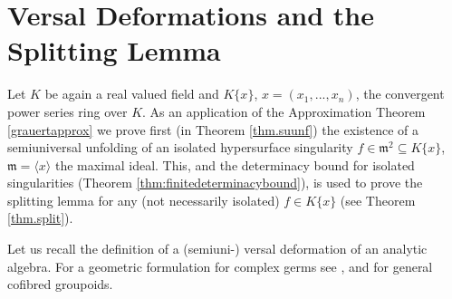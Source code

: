 \documentclass[11pt]{article}
\newcommand{\fm}{\mathfrak{m}}
\begin{document}

\section{Versal Deformations and the Splitting Lemma}\label{sec.split}

Let $K$ be again a real valued field and $K\{x\}$, $x= (x_1,...,x_n)$, the convergent power series ring over $K$. As an application of the Approximation Theorem \ref{grauertapprox} we prove first (in Theorem \ref{thm.suunf}) the existence of a semiuniversal unfolding of an isolated hypersurface singularity $f \in \fm^2 \subseteq K\{x\}$, $\fm =\langle x\rangle$ the maximal ideal. This, and the determinacy bound for isolated singularities (Theorem \ref{thm:finitedeterminacybound}), is used to prove the splitting lemma for any (not necessarily isolated) $f \in K\{x\}$ (see Theorem \ref{thm.split}).
\medskip

Let us recall the definition of a (semiuni-) versal deformation of an analytic algebra. For a geometric formulation for complex germs see \cite{GLS25}, and \cite{St03} for general cofibred groupoids.
\end{document}
